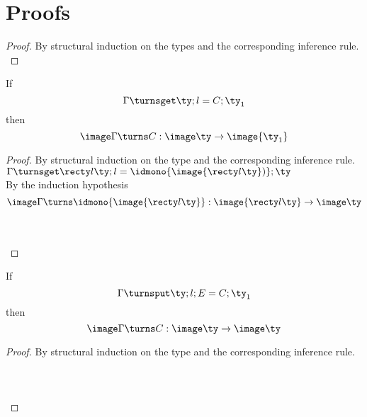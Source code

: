 \section{Proofs}

\begin{proof}
By structural induction on the types and the corresponding inference rule. \\








\end{proof}

\begin{lemma}
  If $$ \Gamma \turnsget \ty ; l = C ; \ty_1 $$
  then $$ \image \Gamma \turns C : \image \ty \to \image {\ty_1} $$
\end{lemma}

\begin{proof}
By structural induction on the type and the corresponding inference rule. \\

 $ \Gamma \turnsget \recty l \ty ; l = \idmono {\image {\recty l \ty})} ; \ty $ \\

By the induction hypothesis
$$ \image \Gamma \turns \idmono {\image {\recty l \ty}} : \image {\recty l \ty} \to \image \ty $$

 \\
 \\

\end{proof}

\begin{lemma}
  If $$ \Gamma \turnsput \ty ; l ; E = C ; \ty_1 $$
  then $$ \image \Gamma \turns C : \image \ty \to \image \ty $$
\end{lemma}

\begin{proof}
By structural induction on the type and the corresponding inference rule. \\

 \\
 \\
 \\
\end{proof}


